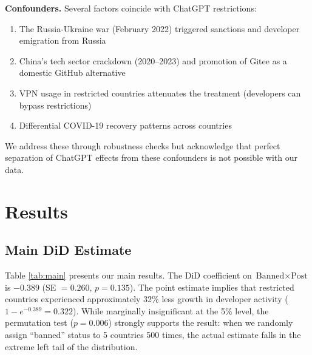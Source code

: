 \documentclass[12pt]{article}
\begin{document}
\textbf{Confounders.} Several factors coincide with ChatGPT restrictions:
\begin{enumerate}
    \item The Russia-Ukraine war (February 2022) triggered sanctions and developer emigration from Russia
    \item China's tech sector crackdown (2020--2023) and promotion of Gitee as a domestic GitHub alternative
    \item VPN usage in restricted countries attenuates the treatment (developers can bypass restrictions)
    \item Differential COVID-19 recovery patterns across countries
\end{enumerate}

We address these through robustness checks but acknowledge that perfect separation of ChatGPT effects from these confounders is not possible with our data.

\section{Results}

\subsection{Main DiD Estimate}

Table \ref{tab:main} presents our main results. The DiD coefficient on $\text{Banned} \times \text{Post}$ is $-0.389$ (SE $= 0.260$, $p = 0.135$). The point estimate implies that restricted countries experienced approximately 32\% less growth in developer activity ($1 - e^{-0.389} = 0.322$). While marginally insignificant at the 5\% level, the permutation test ($p = 0.006$) strongly supports the result: when we randomly assign ``banned'' status to 5 countries 500 times, the actual estimate falls in the extreme left tail of the distribution.
\end{document}
